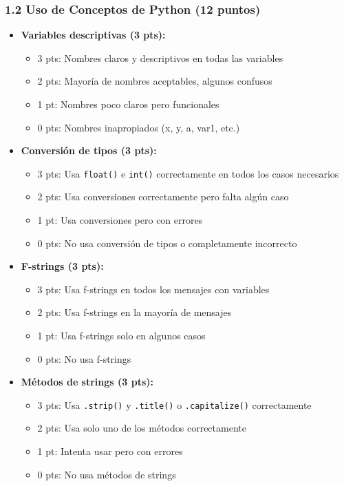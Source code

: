 \documentclass[12pt,a4paper]{article}
\begin{document}
\subsubsection{1.2 Uso de Conceptos de Python (12 puntos)}

\begin{itemize}[leftmargin=*]
    \item \textbf{Variables descriptivas (3 pts):}
    \begin{itemize}
        \item 3 pts: Nombres claros y descriptivos en todas las variables
        \item 2 pts: Mayoría de nombres aceptables, algunos confusos
        \item 1 pt: Nombres poco claros pero funcionales
        \item 0 pts: Nombres inapropiados (x, y, a, var1, etc.)
    \end{itemize}
    
    \item \textbf{Conversión de tipos (3 pts):}
    \begin{itemize}
        \item 3 pts: Usa \texttt{float()} e \texttt{int()} correctamente en todos los casos necesarios
        \item 2 pts: Usa conversiones correctamente pero falta algún caso
        \item 1 pt: Usa conversiones pero con errores
        \item 0 pts: No usa conversión de tipos o completamente incorrecto
    \end{itemize}
    
    \item \textbf{F-strings (3 pts):}
    \begin{itemize}
        \item 3 pts: Usa f-strings en todos los mensajes con variables
        \item 2 pts: Usa f-strings en la mayoría de mensajes
        \item 1 pt: Usa f-strings solo en algunos casos
        \item 0 pts: No usa f-strings
    \end{itemize}
    
    \item \textbf{Métodos de strings (3 pts):}
    \begin{itemize}
        \item 3 pts: Usa \texttt{.strip()} y \texttt{.title()} o \texttt{.capitalize()} correctamente
        \item 2 pts: Usa solo uno de los métodos correctamente
        \item 1 pt: Intenta usar pero con errores
        \item 0 pts: No usa métodos de strings
    \end{itemize}
\end{itemize}
\end{document}
